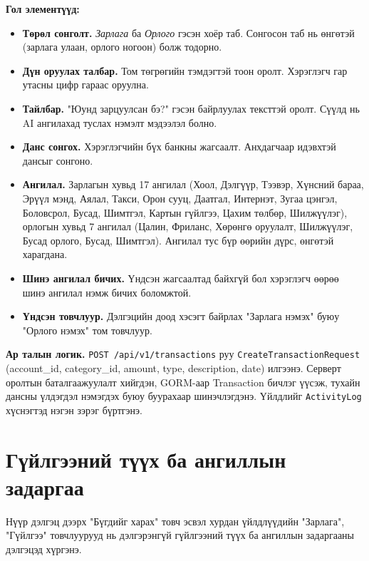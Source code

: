 \textbf{Гол элементүүд:}
\begin{itemize}
    \item \textbf{Төрөл сонголт.} \emph{Зарлага} ба \emph{Орлого} гэсэн хоёр таб. Сонгосон таб нь өнгөтэй (зарлага улаан, орлого ногоон) болж тодорно.
    \item \textbf{Дүн оруулах талбар.} Том төгрөгийн тэмдэгтэй тоон оролт. Хэрэглэгч гар утасны цифр гараас оруулна.
    \item \textbf{Тайлбар.} "Юунд зарцуулсан бэ?" гэсэн байрлуулах тексттэй оролт. Сүүлд нь AI ангилахад туслах нэмэлт мэдээлэл болно.
    \item \textbf{Данс сонгох.} Хэрэглэгчийн бүх банкны жагсаалт. Анхдагчаар идэвхтэй дансыг сонгоно.
    \item \textbf{Ангилал.} Зарлагын хувьд 17 ангилал (Хоол, Дэлгүүр, Тээвэр, Хүнсний бараа, Эрүүл мэнд, Аялал, Такси, Орон сууц, Даатгал, Интернэт, Зугаа цэнгэл, Боловсрол, Бусад, Шимтгэл, Картын гүйлгээ, Цахим төлбөр, Шилжүүлэг), орлогын хувьд 7 ангилал (Цалин, Фриланс, Хөрөнгө оруулалт, Шилжүүлэг, Бусад орлого, Бусад, Шимтгэл). Ангилал тус бүр өөрийн дүрс, өнгөтэй харагдана.
    \item \textbf{Шинэ ангилал бичих.} Үндсэн жагсаалтад байхгүй бол хэрэглэгч өөрөө шинэ ангилал нэмж бичих боломжтой.
    \item \textbf{Үндсэн товчлуур.} Дэлгэцийн доод хэсэгт байрлах "Зарлага нэмэх" буюу "Орлого нэмэх" том товчлуур.
\end{itemize}

\textbf{Ар талын логик.} \texttt{POST /api/v1/transactions} руу \texttt{CreateTransactionRequest} (account\_id, category\_id, amount, type, description, date) илгээнэ. Серверт оролтын баталгаажуулалт хийгдэн, GORM-аар Transaction бичлэг үүсэж, тухайн дансны үлдэгдэл нэмэгдэх буюу буурахаар шинэчлэгдэнэ. Үйлдлийг \texttt{ActivityLog} хүснэгтэд нэгэн зэрэг бүртгэнэ.

\section{Гүйлгээний түүх ба ангиллын задаргаа}
Нүүр дэлгэц дээрх "Бүгдийг харах" товч эсвэл хурдан үйлдлүүдийн "Зарлага", "Гүйлгээ" товчлуурууд нь дэлгэрэнгүй гүйлгээний түүх ба ангиллын задаргааны дэлгэцэд хүргэнэ.

